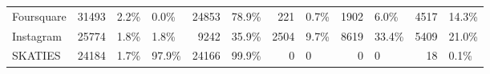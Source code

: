 \begin{tabular}{lrllrlrlrlrl}
Foursquare          &       31493 &        2.2\% &                 0.0\% &             24853 &             78.9\% &               221 &              0.7\% &              1902 &              6.0\% &             4517 &            14.3\% \\
Instagram           &       25774 &        1.8\% &                 1.8\% &              9242 &             35.9\% &              2504 &              9.7\% &              8619 &             33.4\% &             5409 &            21.0\% \\
SKATIES             &       24184 &        1.7\% &                97.9\% &             24166 &             99.9\% &                 0 &                 0 &                 0 &                 0 &               18 &             0.1\% \\
\bottomrule
\end{tabular}
